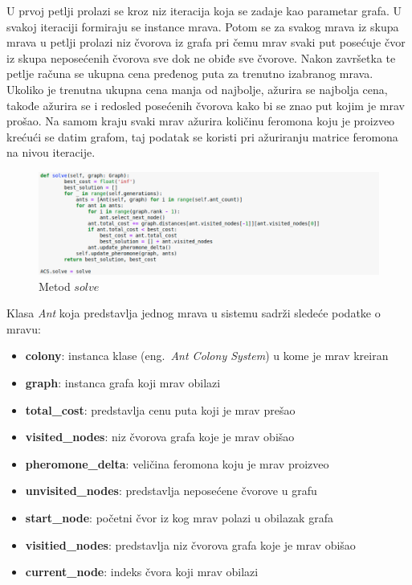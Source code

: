 \documentclass[a4paper]{article}
\begin{document}
U prvoj petlji prolazi se kroz niz iteracija koja se zadaje kao parametar grafa. U svakoj iteraciji formiraju se instance mrava. Potom se za svakog mrava iz skupa mrava u petlji prolazi niz čvorova iz grafa pri čemu mrav svaki put posećuje čvor iz skupa neposećenih čvorova sve dok ne obiđe sve čvorove. Nakon završetka te petlje računa se ukupna cena pređenog puta za trenutno izabranog mrava. Ukoliko je trenutna ukupna cena manja od najbolje, ažurira se najbolja cena, takođe ažurira se i redosled posećenih čvorova kako bi se znao put kojim je mrav prošao. Na samom kraju svaki mrav ažurira količinu feromona koju je proizveo krećući se datim grafom, taj podatak se koristi pri ažuriranju matrice feromona na nivou iteracije. 

\begin{figure}[h!]
\begin{center}
\includegraphics[width=1\columnwidth]{slika4.png}
\end{center}
\caption{Metod $solve$}
\label{fig:slika4}
\end{figure}

\hfill \break

Klasa \textit{Ant} koja predstavlja jednog mrava u sistemu sadrži sledeće podatke o mravu:

\begin{itemize}
\item \textbf{colony}: instanca klase (eng.~{\em Ant Colony System}) u kome je mrav kreiran
\item \textbf{graph}: instanca grafa koji mrav obilazi
\item \textbf{total\_cost}: predstavlja cenu puta koji je mrav prešao
\item \textbf{visited\_nodes}: niz čvorova grafa koje je mrav obišao
\item \textbf{pheromone\_delta}: veličina feromona koju je mrav proizveo
\item \textbf{unvisited\_nodes}: predstavlja neposećene čvorove u grafu
\item \textbf{start\_node}: početni čvor iz kog mrav polazi u obilazak grafa
\item \textbf{visitied\_nodes}: predstavlja niz čvorova grafa koje je mrav obišao
\item \textbf{current\_node}: indeks čvora koji mrav obilazi

\end{itemize}
\end{document}
